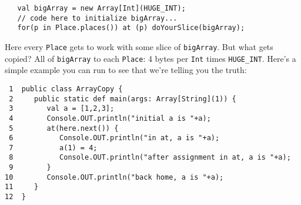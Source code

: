 \begin{verbatim}
   val bigArray = new Array[Int](HUGE_INT);
   // code here to initialize bigArray...
   for(p in Place.places()) at (p) doYourSlice(bigArray);
\end{verbatim}
Here every {\tt Place} gets to work with some slice of {\tt bigArray}. But what
gets copied?  All of {\tt bigArray} to each {\tt Place}: 4 bytes per {\tt Int}
times {\tt HUGE\_INT}.  Here's a simple example you can run to see that we're
telling you the truth:
\begin{verbatim}
 1  public class ArrayCopy {
 2     public static def main(args: Array[String](1)) {
 3        val a = [1,2,3];
 4        Console.OUT.println("initial a is "+a);
 5        at(here.next()) {
 6           Console.OUT.println("in at, a is "+a);
 7           a(1) = 4;                              
 8           Console.OUT.println("after assignment in at, a is "+a); 
 9        }
10        Console.OUT.println("back home, a is "+a); 
11     }
12  }
\end{verbatim}
